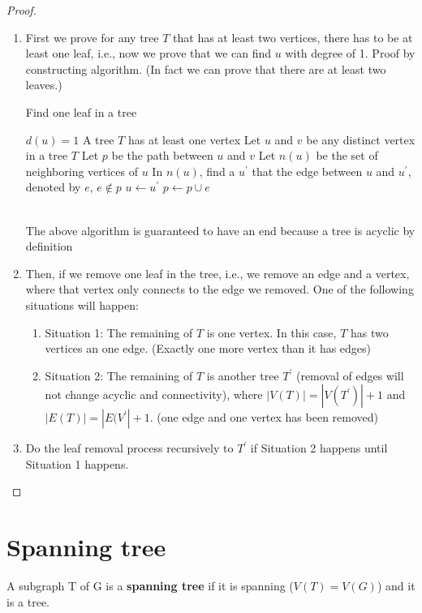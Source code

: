 			\begin{proof}
				\begin{enumerate}
					\item First we prove for any tree $T$ that has at least two vertices, there has to be at least one leaf, i.e., now we prove that we can find $u$ with degree of 1. Proof by constructing algorithm. (In fact we can prove that there are at least two leaves.)\\
						\begin{algorithm}[!ht]
							\caption{Find one leaf in a tree}
							\begin{algorithmic}[1]
								\REQUIRE $d(u)=1$
								\ENSURE A tree $T$ has at least one vertex
								\STATE Let $u$ and $v$ be any distinct vertex in a tree $T$
								\STATE Let $p$ be the path between $u$ and $v$
										\STATE Let $n(u)$ be the set of neighboring vertices of $u$
										\STATE In $n(u)$, find a $u^\prime$ that the edge between $u$ and $u^\prime$, denoted by $e$, $e \notin p$
										\STATE $u \gets u^\prime$
										\STATE $p \gets p \cup e$
									\ENDIF
								\ENDWHILE
							\end{algorithmic}
						\end{algorithm}\\
						The above algorithm is guaranteed to have an end because a tree is acyclic by definition
					\item Then, if we remove one leaf in the tree, i.e., we remove an edge and a vertex, where that vertex only connects to the edge we removed. One of the following situations will happen:
					\begin{enumerate}
						\item Situation 1: The remaining of $T$ is one vertex. In this case, $T$ has two vertices an one edge. (Exactly one more vertex than it has edges)
						\item Situation 2: The remaining of $T$ is another tree $T^{'}$ (removal of edges will not change acyclic and connectivity), where $|V(T)| = |V(T^{'})| + 1$ and $|E(T)| = |E(V^{'}| + 1$. (one edge and one vertex has been removed)
					\end{enumerate}
					\item Do the leaf removal process recursively to $T^{'}$ if Situation 2 happens until Situation 1 happens. 
				\end{enumerate}
			\end{proof}

		\section{Spanning tree}
			\begin{definition}
				A subgraph T of G is a \textbf{spanning tree} if it is spanning ($V(T)=V(G)$) and it is a tree.
			\end{definition}

